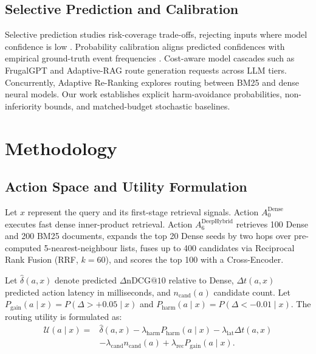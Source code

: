 \documentclass[10pt,journal]{IEEEtran}
\newcommand{\pgain}{P_{\mathrm{gain}}}
\newcommand{\pharm}{P_{\mathrm{harm}}}
\begin{document}
\subsection{Selective Prediction and Calibration}
Selective prediction studies risk-coverage trade-offs, rejecting inputs where model confidence is low \cite{geifman2019selectivenet}. Probability calibration aligns predicted confidences with empirical ground-truth event frequencies \cite{guo2017calibration}. Cost-aware model cascades such as FrugalGPT \cite{chen2023frugalgpt} and Adaptive-RAG \cite{jeong2024adaptiverag} route generation requests across LLM tiers. Concurrently, Adaptive Re-Ranking \cite{genc2026adaptive} explores routing between BM25 and dense neural models. Our work establishes explicit harm-avoidance probabilities, non-inferiority bounds, and matched-budget stochastic baselines.

\section{Methodology}
\label{sec:method}

\subsection{Action Space and Utility Formulation}
Let $x$ represent the query and its first-stage retrieval signals. Action $A_0^{\mathrm{Dense}}$ executes fast dense inner-product retrieval. Action $A_6^{\mathrm{DeepHybrid}}$ retrieves 100 Dense and 200 BM25 documents, expands the top 20 Dense seeds by two hops over pre-computed 5-nearest-neighbour lists, fuses up to 400 candidates via Reciprocal Rank Fusion (RRF, $k=60$), and scores the top 100 with a Cross-Encoder.

Let $\hat{\delta}(a, x)$ denote predicted $\Delta\text{nDCG}@10$ relative to Dense, $\Delta t(a, x)$ predicted action latency in milliseconds, and $n_{\mathrm{cand}}(a)$ candidate count. Let $\pgain(a \mid x) = P(\Delta > +0.05 \mid x)$ and $\pharm(a \mid x) = P(\Delta < -0.01 \mid x)$. The routing utility is formulated as:
\begin{equation}
\begin{split}
\mathcal{U}(a \mid x) ={}& \hat{\delta}(a, x) - \lambda_{\mathrm{harm}} \pharm(a \mid x) - \lambda_{\mathrm{lat}} \Delta t(a, x) \\
&- \lambda_{\mathrm{cand}} n_{\mathrm{cand}}(a) + \lambda_{\mathrm{rec}} \pgain(a \mid x).
\end{split}
\label{eq:utility}
\end{equation}
\end{document}
